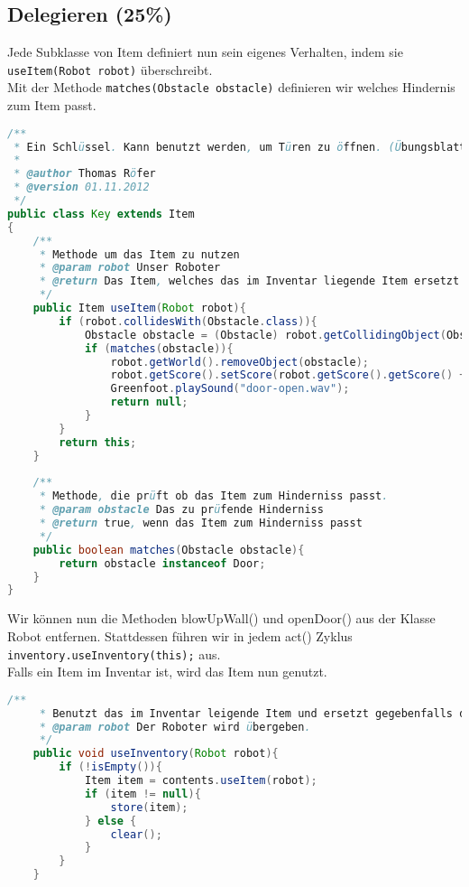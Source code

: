 \documentclass{pi1}
\begin{document}
\subsection{Delegieren (25\%)}

Jede Subklasse von Item definiert nun sein eigenes Verhalten, indem sie \texttt{useItem(Robot robot)} überschreibt.\\
Mit der Methode \texttt{matches(Obstacle obstacle)} definieren wir welches Hindernis zum Item passt.

\begin{lstlisting}[caption={Klasse \emph{Key}}, firstnumber=1, language=Java]
/**
 * Ein Schlüssel. Kann benutzt werden, um Türen zu öffnen. (Übungsblatt 3)
 * 
 * @author Thomas Röfer 
 * @version 01.11.2012
 */
public class Key extends Item
{
    /**
     * Methode um das Item zu nutzen
     * @param robot Unser Roboter
     * @return Das Item, welches das im Inventar liegende Item ersetzt
     */
    public Item useItem(Robot robot){
        if (robot.collidesWith(Obstacle.class)){
            Obstacle obstacle = (Obstacle) robot.getCollidingObject(Obstacle.class);
            if (matches(obstacle)){
                robot.getWorld().removeObject(obstacle);
                robot.getScore().setScore(robot.getScore().getScore() + 100);
                Greenfoot.playSound("door-open.wav");
                return null;
            }
        }
        return this;
    }
    
    /**
     * Methode, die prüft ob das Item zum Hinderniss passt.
     * @param obstacle Das zu prüfende Hinderniss
     * @return true, wenn das Item zum Hinderniss passt
     */
    public boolean matches(Obstacle obstacle){   
        return obstacle instanceof Door;
    }
}
\end{lstlisting}

Wir können nun die Methoden blowUpWall() und openDoor() aus der Klasse Robot entfernen. Stattdessen führen wir in jedem act() Zyklus \texttt{inventory.useInventory(this);} aus.
\\
Falls ein Item im Inventar ist, wird das Item nun genutzt.

\begin{lstlisting}[caption={Klasse \emph{Inventory}, Methode \emph{useInventory}}, firstnumber=67, language=Java]
/**
     * Benutzt das im Inventar leigende Item und ersetzt gegebenfalls das Item
     * @param robot Der Roboter wird übergeben.
     */
    public void useInventory(Robot robot){
        if (!isEmpty()){
            Item item = contents.useItem(robot);
            if (item != null){
                store(item);
            } else {
                clear();
            }
        }
    }
\end{lstlisting}
\end{document}
